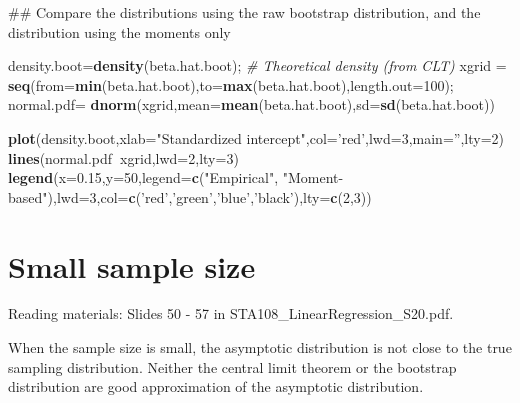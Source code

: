 \documentclass[12pt,]{book}
\newenvironment{Shaded}{\begin{snugshade}}{\end{snugshade}}
\newcommand{\KeywordTok}[1]{\textcolor[rgb]{0.13,0.29,0.53}{\textbf{#1}}}
\newcommand{\DataTypeTok}[1]{\textcolor[rgb]{0.13,0.29,0.53}{#1}}
\newcommand{\DecValTok}[1]{\textcolor[rgb]{0.00,0.00,0.81}{#1}}
\newcommand{\FloatTok}[1]{\textcolor[rgb]{0.00,0.00,0.81}{#1}}
\newcommand{\StringTok}[1]{\textcolor[rgb]{0.31,0.60,0.02}{#1}}
\newcommand{\CommentTok}[1]{\textcolor[rgb]{0.56,0.35,0.01}{\textit{#1}}}
\newcommand{\OperatorTok}[1]{\textcolor[rgb]{0.81,0.36,0.00}{\textbf{#1}}}
\newcommand{\NormalTok}[1]{#1}
\begin{document}
\begin{Shaded}
\begin{Highlighting}[]
\NormalTok{## Compare the distributions using the raw bootstrap distribution, and the distribution using the moments only}


\NormalTok{density.boot=}\KeywordTok{density}\NormalTok{(beta.hat.boot);}
\CommentTok{# Theoretical density (from CLT)}
\NormalTok{xgrid =}\StringTok{ }\KeywordTok{seq}\NormalTok{(}\DataTypeTok{from=}\KeywordTok{min}\NormalTok{(beta.hat.boot),}\DataTypeTok{to=}\KeywordTok{max}\NormalTok{(beta.hat.boot),}\DataTypeTok{length.out=}\DecValTok{100}\NormalTok{);}
\NormalTok{normal.pdf=}\StringTok{ }\KeywordTok{dnorm}\NormalTok{(xgrid,}\DataTypeTok{mean=}\KeywordTok{mean}\NormalTok{(beta.hat.boot),}\DataTypeTok{sd=}\KeywordTok{sd}\NormalTok{(beta.hat.boot))}

\KeywordTok{plot}\NormalTok{(density.boot,}\DataTypeTok{xlab=}\StringTok{"Standardized intercept"}\NormalTok{,}\DataTypeTok{col=}\StringTok{'red'}\NormalTok{,}\DataTypeTok{lwd=}\DecValTok{3}\NormalTok{,}\DataTypeTok{main=}\StringTok{''}\NormalTok{,}\DataTypeTok{lty=}\DecValTok{2}\NormalTok{)}
\KeywordTok{lines}\NormalTok{(normal.pdf}\OperatorTok{~}\NormalTok{xgrid,}\DataTypeTok{lwd=}\DecValTok{2}\NormalTok{,}\DataTypeTok{lty=}\DecValTok{3}\NormalTok{)}
\KeywordTok{legend}\NormalTok{(}\DataTypeTok{x=}\FloatTok{0.15}\NormalTok{,}\DataTypeTok{y=}\DecValTok{50}\NormalTok{,}\DataTypeTok{legend=}\KeywordTok{c}\NormalTok{(}\StringTok{"Empirical"}\NormalTok{, }\StringTok{"Moment-based"}\NormalTok{),}\DataTypeTok{lwd=}\DecValTok{3}\NormalTok{,}\DataTypeTok{col=}\KeywordTok{c}\NormalTok{(}\StringTok{'red'}\NormalTok{,}\StringTok{'green'}\NormalTok{,}\StringTok{'blue'}\NormalTok{,}\StringTok{'black'}\NormalTok{),}\DataTypeTok{lty=}\KeywordTok{c}\NormalTok{(}\DecValTok{2}\NormalTok{,}\DecValTok{3}\NormalTok{))}
\end{Highlighting}
\end{Shaded}

\section{Small sample size}\label{small-sample-size}

Reading materials: Slides 50 - 57 in STA108\_LinearRegression\_S20.pdf.

When the sample size is small, the asymptotic distribution is not close
to the true sampling distribution. Neither the central limit theorem or
the bootstrap distribution are good approximation of the asymptotic
distribution.
\end{document}
